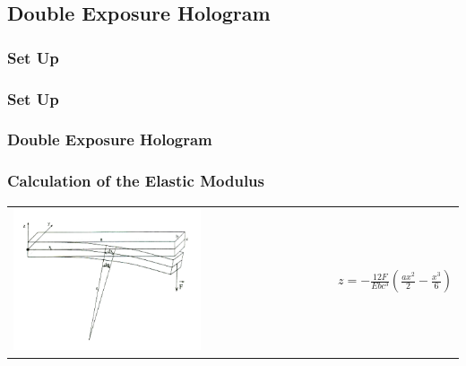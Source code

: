 \documentclass{beamer}
\newcommand{\gra}[3][]{
	\begin{table}
	\centering
	\begin{tabular}[width=\textwidth]{c}
		\texttt{[image: ../figures/\#2.png]}\\
		\small #3
	\end{tabular}
	\end{table}
}
\begin{document}
\subsection{Double Exposure Hologram}
\frame{\tableofcontents[currentsubsection]}
\begin{frame}
	\frametitle{Set Up}
\end{frame}
\begin{frame}
	\frametitle{Set Up}
	\begin{figure}
		\centering
	\end{figure}
\end{frame}
\begin{frame}
	\frametitle{Double Exposure Hologram}
\end{frame}
\begin{frame}
	\frametitle{Calculation of the Elastic Modulus}
	\begin{table}
		\centering
		\begin{tabular}[width=\textwidth]{m{6cm}m{4cm}}
			\includegraphics[width=0.6\textwidth]{../figures/balken_biegen.png}&
			$z=-\frac{12F}{Ebc^3}\left(\frac{ax^2}{2}-\frac{x^3}{6} \right)$
		\end{tabular}
	\end{table}
\end{frame}
\end{document}
